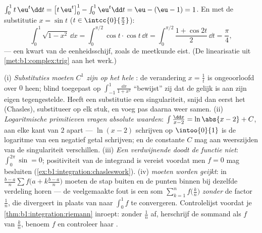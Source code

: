 \begin{example}\label{ex:b1:integration:parts}
$\int_0^1 t\,\eu^t \dd t = \bigl[t\,\eu^t\bigr]_0^1 - \int_0^1
\eu^t\dd t = \eu - (\eu - 1) = 1$. En met de substitutie $x = \sin
t$ ($t \in \intcc{0}{\frac\pi2}$):
\[
\int_0^1 \sqrt{1 - x^2}\, \dd x
= \int_0^{\pi/2} \cos t \cdot \cos t \, \dd t
= \int_0^{\pi/2} \frac{1 + \cos 2t}{2}\, \dd t = \frac\pi4 ,
\]
--- een kwart van de eenheidsschijf, zoals de meetkunde eist.
(De linearisatie uit \cref{met:b1:complex:trig} aan het werk.)
\end{example}

\begin{remark}
(i) \emph{Substituties moeten $C^1$ zijn op het hele }:
de verandering $x = \frac1t$ is ongeoorloofd over $0$ heen; blind
toegepast op $\int_{-1}^{1}\frac{\dd x}{1 + x^2}$ ``bewijst'' zij
dat de  gelijk is aan zijn eigen tegengestelde. Heeft
een substitutie een singulariteit, snijd dan eerst het 
(Chasles), substitueer op elk stuk, en voeg pas daarna weer
samen. (ii) \emph{Logaritmische primitieven vragen absolute
waarden}: $\int \frac{\dd x}{x - 2} = \ln\abs{x - 2} + C$, aan
elke kant van $2$ apart --- $\ln(x - 2)$ schrijven op
$\intoo{0}{1}$ is de logaritme van een negatief getal schrijven;
en de constante $C$ mag aan weerszijden van de singulariteit
verschillen. (iii) \emph{Een verdwijnende  doodt de
functie niet}: $\int_0^{2\pi}\sin = 0$; positiviteit van de
integrand is vereist voordat men $f = 0$ mag besluiten
(\cref{ex:b1:integration:chasleswork}). (iv) \emph{
moeten worden geijkt}: in $\frac{b-a}{n}\sum f\bigl(a +
k\frac{b-a}{n}\bigr)$ moeten de stap buiten en de punten binnen
bij dezelfde verdeling horen --- de veelgemaakte fout is een som
$\sum_{k=1}^{n} f\bigl(\frac kn\bigr)$ \emph{zonder} de factor
$\frac1n$, die divergeert in plaats van naar $\int_0^1 f$ te
convergeren. Controlelijst voordat je
\cref{thm:b1:integration:riemann} inroept: zonder $\frac1n$ af,
herschrijf de sommand als $f$ van $\frac kn$, benoem $f$ en
controleer haar .
\end{remark}

